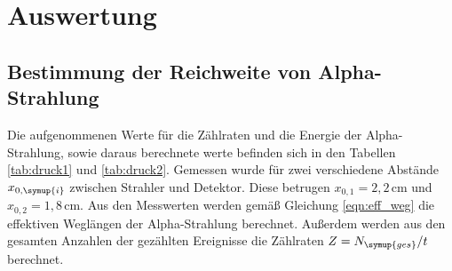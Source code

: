 \section{Auswertung}
\label{sec:Auswertung}

\subsection{Bestimmung der Reichweite von Alpha-Strahlung}
\label{subsec:reichweite}

Die aufgenommenen Werte für die Zählraten und die Energie der Alpha-Strahlung, sowie
daraus berechnete werte befinden sich in den Tabellen \ref{tab:druck1} und \ref{tab:druck2}.
Gemessen wurde für zwei verschiedene Abstände $x_{0,\symup{i}}$ zwischen Strahler und
Detektor. Diese betrugen $x_{0,1}=2{,}2\,$cm und $x_{0,2}=1{,}8\,$cm.
Aus den Messwerten werden gemäß Gleichung \eqref{eqn:eff_weg} die effektiven
Weglängen der Alpha-Strahlung berechnet. Außerdem werden aus den gesamten Anzahlen
der gezählten Ereignisse die Zählraten $Z=N_{\symup{ges}}/t$ berechnet.
